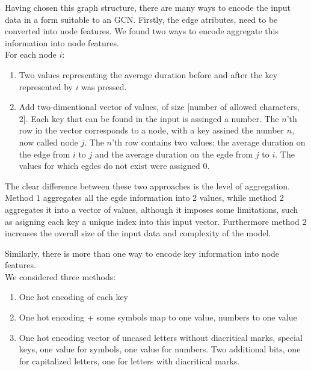 Having chosen this graph structure, there are many ways to encode the input data in a form suitable to an GCN.
Firstly, the edge atributes, need to be converted into node features. We found two ways to encode aggregate this information into node features.\\  
For each node $i$:
\begin{enumerate}
	\item Two values representing the average duration before and after the key represented by $i$ was pressed.
	\item Add two-dimentional vector of values, of size [number of allowed characters, 2]. Each key that can be found in the input is assinged a number. The $n$'th row in the vector corresponds to a node, with a key assined the number $n$, now called node $j$. The $n$'th row contains two values: the average duration on the edge from $i$ to $j$ and the average duration on the egde from $j$ to $i$. The values for which egdes do not exist were assigned 0.
\end{enumerate}
The clear difference between these two approaches is the level of aggregation. Method $1$ aggregates all the egde information into 2 values, while method $2$ aggregates it into a vector of values, although it imposes some limitations, such as asigning each key a unique index into this input vector. Furthermore method $2$ increases the overall size of the input data and complexity of the model.

Similarly, there is more than one way to encode key information into node features.\\
We considered three methods:
\begin{enumerate}
	\item One hot encoding of each key 
	\item One hot encoding + some symbols map to one value, numbers to one value
	\item One hot encoding vector of uncased letters without diacritical marks, special keys, one  value for symbols, one value for numbers. Two additional bits, one for capitalized letters, one for letters with diacritical marks.
\end{enumerate}

